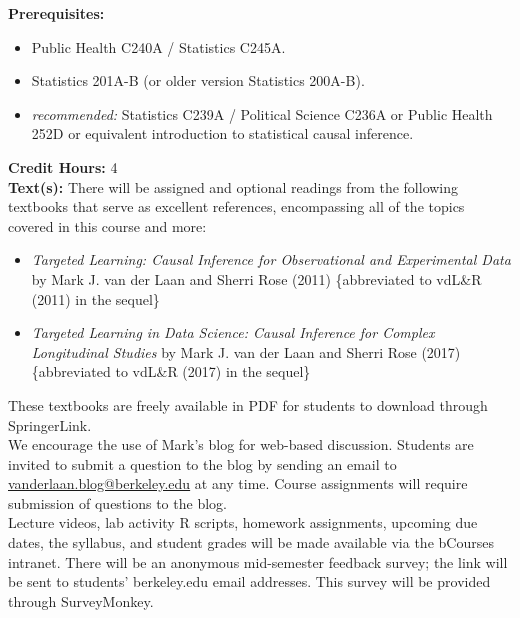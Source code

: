 \documentclass[11pt]{article}
\begin{document}
\newpage

\textbf {Prerequisites:}
\begin{itemize} \itemsep-0.5em
  \item Public Health C240A / Statistics C245A.
  \item Statistics 201A-B (or older version Statistics 200A-B).
  \item \textit{recommended:} Statistics C239A / Political Science C236A or
    Public Health 252D or equivalent introduction to statistical causal
    inference.
\end{itemize}

\textbf {Credit Hours:} 4 \\

\textbf {\large Text(s):}
There will be assigned and optional readings from the following textbooks that
serve as excellent references, encompassing all of the topics covered in this
course and more:
\begin{itemize}
  \item \textit{Targeted Learning: Causal Inference for Observational and
    Experimental Data} by Mark J. van der Laan and Sherri Rose (2011)
    \{abbreviated to vdL\&R (2011) in the sequel\}
  \item \textit{Targeted Learning in Data Science: Causal Inference for Complex
    Longitudinal Studies} by Mark J. van der Laan and Sherri Rose (2017)
    \{abbreviated to vdL\&R (2017) in the sequel\}
\end{itemize}

These textbooks are freely available in PDF for students to download through
SpringerLink. \\

We encourage the use of Mark's blog for web-based discussion. Students are
invited to submit a question to the blog by sending an email to
\href{mailto:vanderlaan.blog@berkeley.edu}{vanderlaan.blog@berkeley.edu} at any
time. Course assignments will require submission of questions to the blog. \\

Lecture videos, lab activity R scripts, homework assignments, upcoming due
dates, the syllabus, and student grades will be made available via the bCourses
intranet. There will be an anonymous mid-semester feedback survey; the link will
be sent to students' berkeley.edu email addresses. This survey will be provided
through SurveyMonkey. \\
\end{document}
